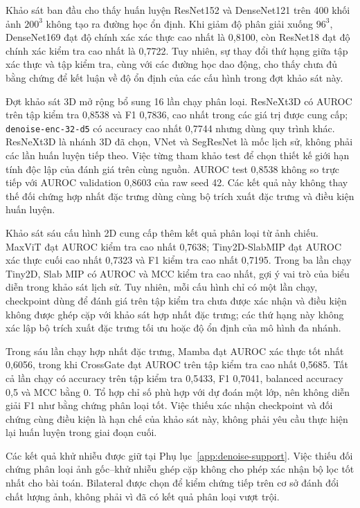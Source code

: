 \documentclass[14pt,a4paper,oneside]{extreport}
\begin{document}
Khảo sát ban đầu cho thấy huấn luyện ResNet152 và DenseNet121 trên 400 khối ảnh
$200^3$ không tạo ra đường học ổn định. Khi giảm độ phân giải xuống $96^3$,
DenseNet169 đạt độ chính xác xác thực cao nhất là 0,8100, còn ResNet18 đạt độ
chính xác kiểm tra cao nhất là 0,7722. Tuy nhiên, sự thay đổi thứ hạng giữa tập
xác thực và tập kiểm tra, cùng với các đường học dao động, cho thấy chưa đủ bằng
chứng để kết luận về độ ổn định của các cấu hình trong đợt khảo sát này.

Đợt khảo sát 3D mở rộng bổ sung 16 lần chạy phân loại. ResNeXt3D có AUROC
trên tập kiểm tra 0,8538 và F1 0,7836, cao nhất trong các giá trị được cung cấp;
\texttt{denoise-enc-32-d5} có accuracy cao nhất 0,7744 nhưng dùng
quy trình khác. ResNeXt3D là nhánh 3D đã chọn, VNet và
SegResNet là mốc lịch sử, không phải các lần huấn luyện tiếp theo.
Việc từng tham khảo test để chọn thiết kế giới hạn tính độc lập của
đánh giá trên cùng nguồn. AUROC test 0,8538 không so trực tiếp với
AUROC validation 0,8603 của raw seed 42. Các kết quả này không thay thế đối chứng hợp nhất đặc trưng
dùng cùng bộ trích xuất đặc trưng và điều kiện huấn luyện.

Khảo sát sáu cấu hình 2D cung cấp thêm kết quả phân loại từ ảnh chiếu.
MaxViT đạt AUROC kiểm tra cao nhất 0,7638; Tiny2D-SlabMIP đạt AUROC
xác thực cuối cao nhất 0,7323 và F1 kiểm tra cao nhất 0,7195.
Trong ba lần chạy Tiny2D, Slab MIP có AUROC và MCC kiểm tra cao nhất,
gợi ý vai trò của biểu diễn trong khảo sát lịch sử. Tuy nhiên,
mỗi cấu hình chỉ có một lần chạy, checkpoint dùng để đánh giá trên tập kiểm tra chưa được xác nhận
và điều kiện không được ghép cặp với khảo sát hợp nhất đặc trưng; các thứ hạng này không xác lập
bộ trích xuất đặc trưng tối ưu hoặc độ ổn định của mô hình đa nhánh.

Trong sáu lần chạy hợp nhất đặc trưng, Mamba đạt AUROC xác thực tốt nhất 0,6056,
trong khi CrossGate đạt AUROC trên tập kiểm tra cao nhất 0,5685. Tất cả lần chạy có
accuracy trên tập kiểm tra 0,5433, F1 0,7041, balanced accuracy 0,5 và MCC bằng 0.
Tổ hợp chỉ số phù hợp với dự đoán một lớp, nên không diễn giải F1
như bằng chứng phân loại tốt. Việc thiếu xác nhận checkpoint và
đối chứng cùng điều kiện là hạn chế của khảo sát này, không phải
yêu cầu thực hiện lại huấn luyện trong giai đoạn cuối.

Các kết quả khử nhiễu được giữ tại Phụ lục~\ref{app:denoise-support}.
Việc thiếu đối chứng phân loại ảnh gốc--khử nhiễu ghép cặp không cho phép
xác nhận bộ lọc tốt nhất cho bài toán. Bilateral được chọn để kiểm
chứng tiếp trên cơ sở đánh đổi chất lượng ảnh, không phải vì đã có
kết quả phân loại vượt trội.
\end{document}
